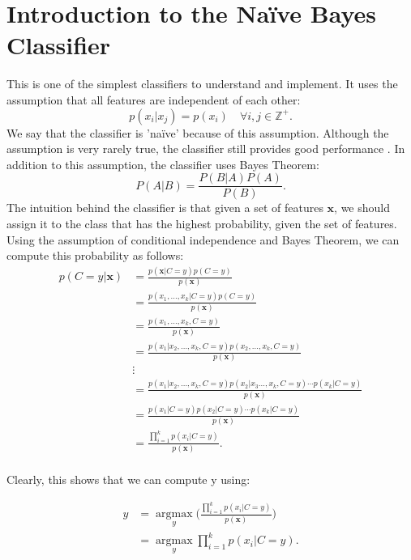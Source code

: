 \documentclass[12pt,a4paper,twoside,openright]{report}
\begin{document}
\section{Introduction to the Na\"{i}ve Bayes Classifier}

This is one of the simplest classifiers to understand and implement. It uses the assumption that all features are independent of each other:
\begin{equation}
	p(x_i | x_j) = p(x_i) \quad \forall i, j \in \mathbb{Z}^+.
\end{equation}
We say that the classifier is 'na\"{i}ve' because of this assumption. Although the assumption is very rarely true, the classifier still provides good performance \cite{ml_book_murphy}.
\newline
\newline
In addition to this assumption, the classifier uses Bayes Theorem:
\begin{equation}
	P(A | B) = \frac{P(B | A)P(A)}{P(B)}.
\end{equation}
The intuition behind the classifier is that given a set of features $\mathbf{x}$, we should assign it to the class that has the highest probability, given the set of features. Using the assumption of conditional independence and Bayes Theorem, we can compute this probability as follows:
\begin{equation}
\begin{aligned}
p(C = y | \mathbf{x}) &= \frac{p(\mathbf{x} | C = y)p(C = y)}{p(\mathbf{x})} \\
&= \frac{p(x_1, \ldots, x_k | C = y)p(C = y)}{p(\mathbf{x})} \\
&= \frac{p(x_1, \ldots, x_k, C = y)}{p(\mathbf{x})} \\
&= \frac{p(x_1 | x_2, \ldots, x_k, C = y)p(x_2, \ldots, x_k, C = y)}{p(\mathbf{x})} \\
& \vdots \\
&= \frac{p(x_1 | x_2, \ldots, x_k, C = y)p(x_2 | x_3 \ldots, x_k, C = y)\cdots p(x_k | C = y)}{p(\mathbf{x})} \\
&= \frac{p(x_1 | C = y)p(x_2 | C = y) \cdots p(x_k | C = y)}{p(\mathbf{x})} \\
&= \frac{\prod_{i = 1}^{k}p(x_i | C = y)}{p(\mathbf{x})}. \\
\end{aligned}
\end{equation}

Clearly, this shows that we can compute y using:

\begin{equation}
\begin{aligned}
y &= \underset{y}{\operatorname{argmax}}\bigg(\frac{\prod_{i = 1}^{k}p(x_i | C = y)}{p(\mathbf{x})}\bigg) \\
&= \underset{y}{\operatorname{argmax}} \displaystyle \prod_{i = 1}^{k}p(x_i | C = y). \\
\end{aligned}
\end{equation}
\end{document}
